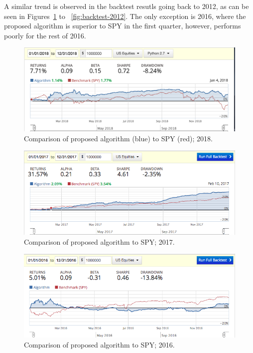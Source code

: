 \documentclass{article}
\begin{document}
\begin{case}
A similar trend is observed in the backtest resutls going back to
2012, as can be seen in Figures~\ref{fig:backtest-2018} to
~\ref{fig:backtest-2012}. The only exception is 2016, where the
proposed algorithm is superior to SPY in the first quarter, however,
performs poorly for the rest of 2016.

\begin{figure}\label{fig:backtest-2018}
\includegraphics[bb=0 0 640 480]{figures/mad_mfd_macd_2018.png}
\caption{Comparison of proposed algorithm (blue) to SPY (red); 2018.}  
\end{figure}

\begin{figure}\label{fig:backtest-2017}
\includegraphics[bb=0 0 640 480]{figures/mad_mfd_macd_2017.png}
\caption{Comparison of proposed algorithm to SPY; 2017.}  
\end{figure}

\begin{figure}\label{fig:backtest-2016}
\includegraphics[bb=0 0 640 480]{figures/mad_mfd_macd_2016.png}
\caption{Comparison of proposed algorithm to SPY; 2016.}  
\end{figure}


\end{case}
\end{document}
